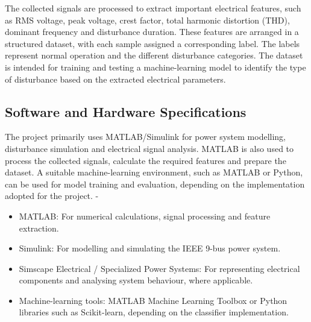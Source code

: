 \documentclass[12pt]{article}
\begin{document}
\begin{center}
\begin{enumerate}
The collected signals are processed to extract important electrical features, such as RMS voltage, peak voltage, crest factor, total harmonic distortion (THD), dominant frequency and disturbance duration. These features are arranged in a structured dataset, with each sample assigned a corresponding label. The labels represent normal operation and the different disturbance categories. The dataset is intended for training and testing a machine-learning model to identify the type of disturbance based on the extracted electrical parameters.\\

\subsection{Software and Hardware Specifications}
\justifying
The project primarily uses MATLAB/Simulink for power system modelling, disturbance simulation and electrical signal analysis. MATLAB is also used to process the collected signals, calculate the required features and prepare the dataset. A suitable machine-learning environment, such as MATLAB or Python, can be used for model training and evaluation, depending on the implementation adopted for the project.
-
\justifying
\begin{itemize}
    \item  MATLAB: For numerical calculations, signal processing and feature extraction.
\end{itemize}\begin{itemize}
    \item Simulink: For modelling and simulating the IEEE 9-bus power system.
\end{itemize}\begin{itemize}
    \item Simscape Electrical / Specialized Power Systems: For representing electrical components and analysing system behaviour, where applicable.
\end{itemize}\begin{itemize}
    \item Machine-learning tools: MATLAB Machine Learning Toolbox or Python libraries such as Scikit-learn, depending on the classifier implementation.
\end{itemize}\\\vspace{1cm}



\begin{figure}[H]
    \begin{center}
    

\end{center}
\end{figure}
\end{enumerate}
\end{center}
\end{document}
